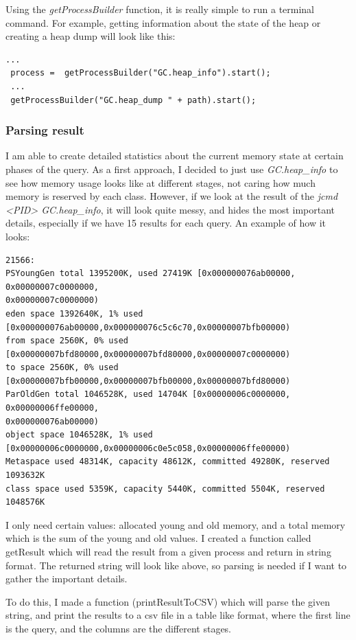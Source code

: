 Using the \textit{getProcessBuilder} function, it is really simple to run a terminal command. For example, getting information about the state of the heap or creating a heap dump will look like this:

\begin{lstlisting}
...
 process =  getProcessBuilder("GC.heap_info").start();
 ...
 getProcessBuilder("GC.heap_dump " + path).start();
\end{lstlisting}

\subsubsection{Parsing result}
I am able to create detailed statistics about the current memory state at certain phases of the query. As a first approach, I decided to just use \textit{GC.heap\_info} to see how memory usage looks like at different stages, not caring how much memory is reserved by each class. However, if we look at the result of the \textit{jcmd <PID> GC.heap\_info}, it will look quite messy, and hides the most important details, especially if we have 15 results for each query. An example of how it looks:

\begin{lstlisting}
21566:
PSYoungGen total 1395200K, used 27419K [0x000000076ab00000, 0x00000007c0000000,
0x00000007c0000000)
eden space 1392640K, 1% used
[0x000000076ab00000,0x000000076c5c6c70,0x00000007bfb00000)
from space 2560K, 0% used [0x00000007bfd80000,0x00000007bfd80000,0x00000007c0000000)
to space 2560K, 0% used [0x00000007bfb00000,0x00000007bfb00000,0x00000007bfd80000)
ParOldGen total 1046528K, used 14704K [0x00000006c0000000, 0x00000006ffe00000,
0x000000076ab00000)
object space 1046528K, 1% used
[0x00000006c0000000,0x00000006c0e5c058,0x00000006ffe00000)
Metaspace used 48314K, capacity 48612K, committed 49280K, reserved 1093632K
class space used 5359K, capacity 5440K, committed 5504K, reserved 1048576K
\end{lstlisting}

I only need certain values: allocated young and old memory, and a total memory which is the sum of the young and old values. I created a function called getResult which will read the result from a given process and return in string format. The returned string will look like above, so parsing is needed if I want to gather the important details.

To do this, I made a function (printResultToCSV) which will parse the given string, and print the results to a csv file in a table like format, where the first line is the query, and the columns are the different stages.

